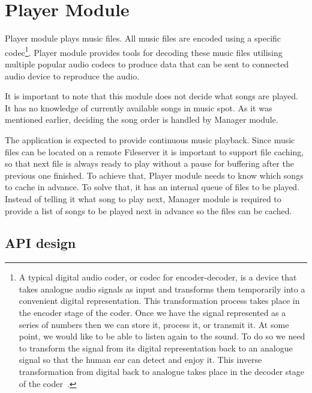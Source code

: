 \section{Player Module}

Player module plays music files. All music files are encoded using a specific codec\footnote{A typical digital audio coder, or codec for encoder-decoder, is a device that takes analogue audio signals as input and transforms them temporarily into a convenient digital representation. This transformation process takes place in the encoder stage of the coder. Once we have the signal represented as a series of numbers then we can store it, process it, or transmit it. At some point, we would like to be able to listen again to the sound. To do so we need to transform the signal from its digital representation back to an analogue signal so that the human ear can detect and enjoy it. This inverse transformation from digital back to analogue takes place in the decoder stage of the coder~\citep{IntroToDigitalAudio}.}. Player module provides tools for decoding these music files utilising multiple popular audio codecs to produce data that can be sent to connected audio device to reproduce the audio.
\par
It is important to note that this module does not decide what songs are played. It has no knowledge of currently available songs in music spot. As it was mentioned earlier, deciding the song order is handled by Manager module.
\par
The application is expected to provide continuous music playback. Since music files can be located on a remote Fileserver it is important to support file caching, so that next file is always ready to play without a pause for buffering after the previous one finished. To achieve that, Player module needs to know which songs to cache in advance. To solve that, it has an internal queue of files to be played. Instead of telling it what song to play next, Manager module is required to provide a list of songs to be played next in advance so the files can be cached.

\subsection{API design}

